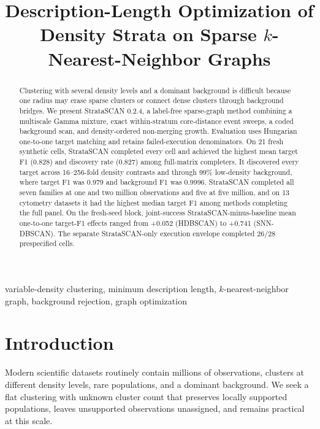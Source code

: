 \documentclass[conference]{IEEEtran}
\title{Description-Length Optimization of Density Strata on Sparse $k$-Nearest-Neighbor Graphs}
\author{\IEEEauthorblockN{Anonymous Author(s)}
\IEEEauthorblockA{Anonymous submission for triple-blind review}}
\newcommand{\method}{StrataSCAN}
\begin{document}
\maketitle

\begin{abstract}
Clustering with several density levels and a dominant background is difficult because one radius may erase sparse clusters or connect dense clusters through background bridges. We present \method{} 0.2.4, a label-free sparse-graph method combining a multiscale Gamma mixture, exact within-stratum core-distance event sweeps, a coded background scan, and density-ordered non-merging growth. Evaluation uses Hungarian one-to-one target matching and retains failed-execution denominators. On 21 fresh synthetic cells, StrataSCAN completed every cell and achieved the highest mean target F1 (0.828) and discovery rate (0.827) among full-matrix completers. It discovered every target across 16--256-fold density contrasts and through 99\% low-density background, where target F1 was 0.979 and background F1 was 0.9996. StrataSCAN completed all seven families at one and two million observations and five at five million, and on 13 cytometry datasets it had the highest median target F1 among methods completing the full panel.
On the fresh-seed block, joint-success StrataSCAN-minus-baseline mean one-to-one target-F1 effects ranged from +0.052 (HDBSCAN) to +0.741 (SNN-DBSCAN). The separate StrataSCAN-only execution envelope completed 26/28 prespecified cells.
\end{abstract}

\begin{IEEEkeywords}
variable-density clustering, minimum description length, $k$-nearest-neighbor graph, background rejection, graph optimization
\end{IEEEkeywords}

\section{Introduction}
Modern scientific datasets routinely contain millions of observations, clusters at different density levels, rare populations, and a dominant background. We seek a flat clustering with unknown cluster count that preserves locally supported populations, leaves unsupported observations unassigned, and remains practical at this scale.
\end{document}
